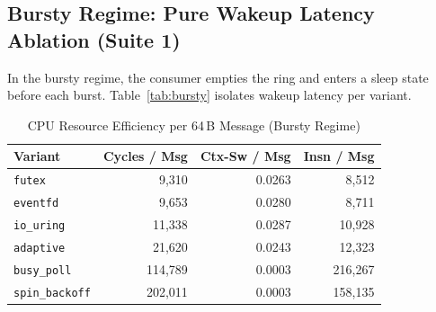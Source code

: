 \documentclass[10pt,conference]{IEEEtran}
\begin{document}
\subsection{Bursty Regime: Pure Wakeup Latency Ablation (Suite 1)}

In the bursty regime, the consumer empties the ring and enters a sleep state
before each burst.  Table~\ref{tab:bursty} isolates wakeup latency per variant.

\begin{table}[H]
  \centering
  \caption{Bursty-Regime Wakeup and End-to-End Latencies at 64\,B}
  \label{tab:bursty}
  \small
\end{table}

\begin{table}[H]
  \centering
  \caption{CPU Resource Efficiency per 64\,B Message (Bursty Regime)}
  \label{tab:cpucost}
  \small
  \begin{tabular}{@{}lrrr@{}}
    \toprule
    \textbf{Variant} & \textbf{Cycles / Msg} & \textbf{Ctx-Sw / Msg} & \textbf{Insn / Msg} \\
    \midrule
    \texttt{futex}         & 9,310   & 0.0263 & 8,512 \\
    \texttt{eventfd}       & 9,653   & 0.0280 & 8,711 \\
    \texttt{io\_uring}     & 11,338  & 0.0287 & 10,928 \\
    \texttt{adaptive}      & 21,620  & 0.0243 & 12,323 \\
    \texttt{busy\_poll}    & 114,789 & 0.0003 & 216,267 \\
    \texttt{spin\_backoff} & 202,011 & 0.0003 & 158,135 \\
    \bottomrule
  \end{tabular}
\end{table}
\end{document}
